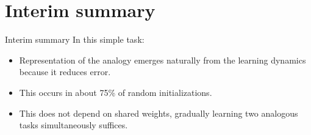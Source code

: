 \documentclass{beamer}
\begin{document}
\section{Interim summary}
\begin{frame}{Interim summary}
 In this simple task:
\begin{itemize}
    \item<2-> Representation of the analogy emerges naturally from the learning dynamics because it reduces error.
    \item<3-> This occurs in about 75\% of random initializations.
    \item<4-> This does not depend on shared weights, gradually learning two analogous tasks simultaneously suffices.
\end{itemize}
\end{frame}
\end{document}
